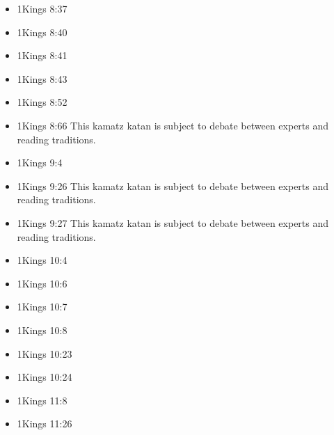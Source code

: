 \documentclass[14pt]{book}
\begin{document}
\begin{multicols}{2}
\begin{itemize}
									\item 1Kings 8:37
									
									\item 1Kings 8:40
									
									\item 1Kings 8:41
									
									\item 1Kings 8:43
									
									\item 1Kings 8:52
									
									\item 1Kings 8:66 This kamatz katan is subject to debate between experts and reading traditions.
									
									\item 1Kings 9:4
									
									\item 1Kings 9:26 This kamatz katan is subject to debate between experts and reading traditions.
									
									\item 1Kings 9:27 This kamatz katan is subject to debate between experts and reading traditions.
									
									\item 1Kings 10:4
									
									\item 1Kings 10:6
									
									\item 1Kings 10:7
									
									\item 1Kings 10:8
									
									\item 1Kings 10:23
											
											\item 1Kings 10:24
											
											\item 1Kings 11:8
											
											\item 1Kings 11:26
											

\end{itemize}
\end{multicols}
\end{document}
